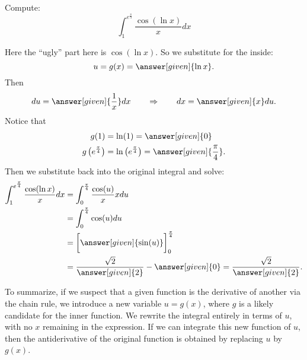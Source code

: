 \documentclass{ximera}
\begin{document}
\begin{example}
  Compute:
  \[
  \int_{1}^{e^{\frac{\pi}{4}}} \frac{\cos(\ln x)}{x} dx
  \]
\begin{explanation}
Here the ``ugly'' part here is $\cos(\ln x)$.  So we substitute for
the inside:
\[
u=g(x)=\answer[given]{\ln x}.
\]
Then
\[
du =  \answer[given]{\frac{1}{x}} dx 	\qquad	\Rightarrow	\qquad	dx = \answer[given]{x} du.
\]
Notice that
\begin{align*}
g(1) &= \ln (1) = \answer[given]{0} \\
g \left( e^{\frac{\pi}{4}} \right) &= \ln \left( e^{\frac{\pi}{4}} \right) = \answer[given]{\frac{\pi}{4}}.
\end{align*}
Then we substitute back into the original integral and solve:
\begin{align*}
\int_{1}^{e^{\frac{\pi}{4}}} \frac{\cos(\ln x)}{x} dx &= \int_0^{\frac{\pi}{4}} \frac{\cos(u)}{x} x du  \\
&= \int_0^{\frac{\pi}{4}} \cos(u) du  \\
&= \bigg[ \answer[given]{\sin(u)} \bigg]_{0}^{\frac{\pi}{4}}  \\
&= \frac{\sqrt{2}}{\answer[given]{2}} - \answer[given]{0} = \frac{\sqrt{2}}{\answer[given]{2}}.
\end{align*}
\end{explanation}
\end{example}

To summarize, if we suspect that a given function is the derivative of
another via the chain rule, we introduce a new variable $u=g(x)$, where $g$ is a likely candidate for
the inner function. We rewrite the integral
 entirely in terms of $u$, with no $x$ remaining in the
expression. If we can integrate this new function of $u$, then the
antiderivative of the original function is obtained by replacing $u$
by $g(x)$.
\end{document}
